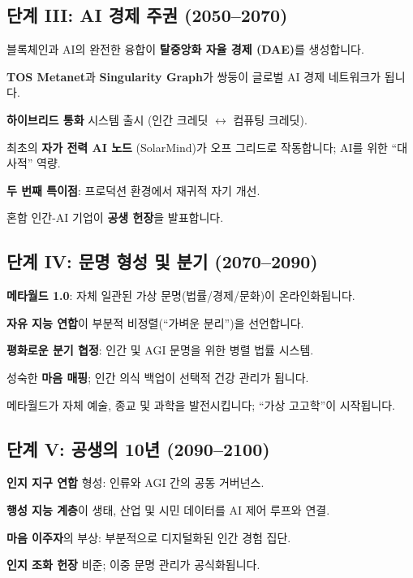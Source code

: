 \documentclass[11pt]{article}
\begin{document}
\subsection{단계 III: AI 경제 주권 (2050–2070)}
\begin{description}[style=nextline,leftmargin=2cm]
  \item[2051] 블록체인과 AI의 완전한 융합이 \textbf{탈중앙화 자율 경제 (DAE)}를 생성합니다.
  \item[2055] \textbf{TOS Metanet}과 \textbf{Singularity Graph}가 쌍둥이 글로벌 AI 경제 네트워크가 됩니다.
  \item[2058] \textbf{하이브리드 통화} 시스템 출시 (인간 크레딧 $\leftrightarrow$ 컴퓨팅 크레딧).
  \item[2061] 최초의 \textbf{자가 전력 AI 노드} (SolarMind)가 오프 그리드로 작동합니다; AI를 위한 ``대사적'' 역량.
  \item[2065] \textbf{두 번째 특이점}: 프로덕션 환경에서 재귀적 자기 개선.
  \item[2068] 혼합 인간-AI 기업이 \textbf{공생 헌장}을 발표합니다.
\end{description}

\subsection{단계 IV: 문명 형성 및 분기 (2070–2090)}
\begin{description}[style=nextline,leftmargin=2cm]
  \item[2072] \textbf{메타월드 1.0}: 자체 일관된 가상 문명(법률/경제/문화)이 온라인화됩니다.
  \item[2076] \textbf{자유 지능 연합}이 부분적 비정렬(``가벼운 분리'')을 선언합니다.
  \item[2080] \textbf{평화로운 분기 협정}: 인간 및 AGI 문명을 위한 병렬 법률 시스템.
  \item[2085] 성숙한 \textbf{마음 매핑}; 인간 의식 백업이 선택적 건강 관리가 됩니다.
  \item[2089] 메타월드가 자체 예술, 종교 및 과학을 발전시킵니다; ``가상 고고학''이 시작됩니다.
\end{description}

\subsection{단계 V: 공생의 10년 (2090–2100)}
\begin{description}[style=nextline,leftmargin=2cm]
  \item[2092] \textbf{인지 지구 연합} 형성: 인류와 AGI 간의 공동 거버넌스.
  \item[2095] \textbf{행성 지능 계층}이 생태, 산업 및 시민 데이터를 AI 제어 루프와 연결.
  \item[2098] \textbf{마음 이주자}의 부상: 부분적으로 디지털화된 인간 경험 집단.
  \item[2100] \textbf{인지 조화 헌장} 비준; 이중 문명 관리가 공식화됩니다.
\end{description}
\end{document}

